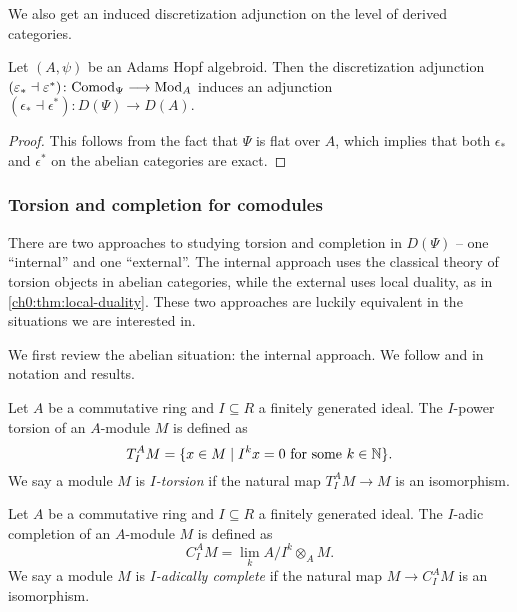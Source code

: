 We also get an induced discretization adjunction on the level of derived categories. 

\begin{proposition}
    Let $(A,\psi)$ be an Adams Hopf algebroid. Then the discretization adjunction $(\varepsilon_*\dashv \varepsilon^*)\colon \mathrm{Comod}_\Psi\longrightarrow \mathrm{Mod}_A$ induces an adjunction $(\epsilon_*\dashv \epsilon^*)\colon D(\Psi)\longrightarrow D(A).$
\end{proposition}
\begin{proof}
    This follows from the fact that $\Psi$ is flat over $A$, which implies that both $\epsilon_*$ and $\epsilon^*$ on the abelian categories are exact. 
\end{proof}






\subsubsection{Torsion and completion for comodules}
\label{ch0:sssec:torsion-and-completion-for-comodules}

There are two approaches to studying torsion and completion in $D(\Psi)$ -- one ``internal'' and one ``external''. The internal approach uses the classical theory of torsion objects in abelian categories, while the external uses local duality, as in \cref{ch0:thm:local-duality}. These two approaches are luckily equivalent in the situations we are interested in. 

We first review the abelian situation: the internal approach. We follow \cite{barthel-heard-valenzuela_2018} and \cite{barthel-heard-valenzuela_2020} in notation and results. 

\begin{definition}
    \label{def:I-power-torsion-module}
    Let $A$ be a commutative ring and $I\subseteq R$ a finitely generated ideal. The $I$-power torsion of an $A$-module $M$ is defined as
    $$T_I^A M = \{x\in M \mid I^k x = 0 \text{ for some } k\in \mathbb{N}\}.$$
    We say a module $M$ is \emph{$I$-torsion} if the natural map $T_I^A M\longrightarrow M$ is an isomorphism. 
\end{definition}

\begin{definition}
    Let $A$ be a commutative ring and $I\subseteq R$ a finitely generated ideal. The $I$-adic completion of an $A$-module $M$ is defined as
    $$C_I^A M = \lim_k A/I^k\otimes_A M.$$
    We say a module $M$ is \emph{$I$-adically complete} if the natural map $M\longrightarrow C_I^A M$ is an isomorphism. 
\end{definition}

